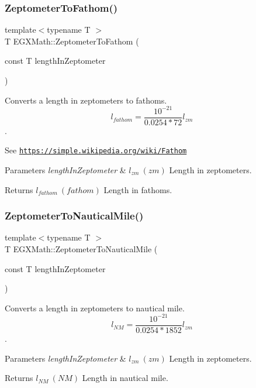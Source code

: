 \subsubsection{\texorpdfstring{Zeptometer\+To\+Fathom()}{ZeptometerToFathom()}}
{\footnotesize\ttfamily template$<$typename T $>$ \\
T E\+G\+X\+Math\+::\+Zeptometer\+To\+Fathom (\begin{DoxyParamCaption}\item[{const T}]{length\+In\+Zeptometer }\end{DoxyParamCaption})}



Converts a length in zeptometers to fathoms. \[ l_{fathom}= \frac{10^{-21}}{0.0254 * 72} l_{zm} \]. 

See \href{https://simple.wikipedia.org/wiki/Fathom}{\tt https\+://simple.\+wikipedia.\+org/wiki/\+Fathom} 
\begin{DoxyParams}{Parameters}
{\em length\+In\+Zeptometer} & $ l_{zm}\ (zm)$ Length in zeptometers. \\
\hline
\end{DoxyParams}
\begin{DoxyReturn}{Returns}
$ l_{fathom}\ (fathom)$ Length in fathoms. 
\end{DoxyReturn}
\mbox{\label{group___e_g_x_math-_conversions-_length_conversions-_s_i-_zeptometer-_nautical_ga9d6a1de6b4a8de39ba16da0a17cdca42}} 
\subsubsection{\texorpdfstring{Zeptometer\+To\+Nautical\+Mile()}{ZeptometerToNauticalMile()}}
{\footnotesize\ttfamily template$<$typename T $>$ \\
T E\+G\+X\+Math\+::\+Zeptometer\+To\+Nautical\+Mile (\begin{DoxyParamCaption}\item[{const T}]{length\+In\+Zeptometer }\end{DoxyParamCaption})}



Converts a length in zeptometers to nautical mile. \[ l_{NM}= \frac{10^{-21}}{0.0254 * 1852} l_{zm} \]. 


\begin{DoxyParams}{Parameters}
{\em length\+In\+Zeptometer} & $ l_{zm}\ (zm)$ Length in zeptometers. \\
\hline
\end{DoxyParams}
\begin{DoxyReturn}{Returns}
$ l_{NM}\ (NM)$ Length in nautical mile. 
\end{DoxyReturn}
